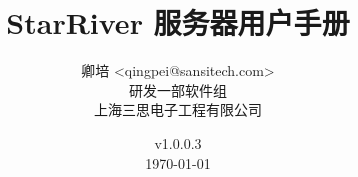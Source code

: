\title{\textbf{StarRiver 服务器用户手册}}

\author{卿培 <qingpei@sansitech.com> \\
        研发一部软件组\\
        上海三思电子工程有限公司
}

\date{\vspace{3em} v1.0.0.3 \\\vspace{3em} \today}

